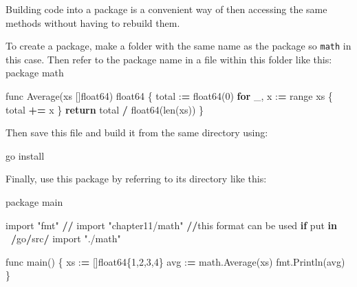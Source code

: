 \documentclass[]{book}
\newenvironment{Shaded}{\begin{snugshade}}{\end{snugshade}}
\newcommand{\BuiltInTok}[1]{#1}
\newcommand{\ControlFlowTok}[1]{\textcolor[rgb]{0.13,0.29,0.53}{\textbf{#1}}}
\newcommand{\DecValTok}[1]{\textcolor[rgb]{0.00,0.00,0.81}{#1}}
\newcommand{\ImportTok}[1]{#1}
\newcommand{\KeywordTok}[1]{\textcolor[rgb]{0.13,0.29,0.53}{\textbf{#1}}}
\newcommand{\NormalTok}[1]{#1}
\newcommand{\OperatorTok}[1]{\textcolor[rgb]{0.81,0.36,0.00}{\textbf{#1}}}
\newcommand{\StringTok}[1]{\textcolor[rgb]{0.31,0.60,0.02}{#1}}
\begin{document}
Building code into a package is a convenient way of then accessing the same methods without having to rebuild them.

To create a package, make a folder with the same name as the package so \texttt{math} in this case. Then refer to the package name in a file within this folder like this:
package math

\begin{Shaded}
\begin{Highlighting}[]
\NormalTok{func Average(xs []float64) float64 \{}
\NormalTok{    total :}\OperatorTok{=}\NormalTok{ float64(}\DecValTok{0}\NormalTok{)             }
    \ControlFlowTok{for}\NormalTok{ _, x :}\OperatorTok{=} \BuiltInTok{range}\NormalTok{ xs \{          }
\NormalTok{        total }\OperatorTok{+=}\NormalTok{ x                  }
\NormalTok{    \}                               }
    \ControlFlowTok{return}\NormalTok{ total }\OperatorTok{/}\NormalTok{ float64(}\BuiltInTok{len}\NormalTok{(xs)) }
\NormalTok{\}                                   }
\end{Highlighting}
\end{Shaded}

Then save this file and build it from the same directory using:

\begin{Shaded}
\begin{Highlighting}[]
\NormalTok{go install}
\end{Highlighting}
\end{Shaded}

Finally, use this package by referring to its directory like this:

\begin{Shaded}
\begin{Highlighting}[]
\NormalTok{package main                          }
                                      
\ImportTok{import} \StringTok{"fmt"}                          
\OperatorTok{//} \ImportTok{import} \StringTok{"chapter11/math"} \OperatorTok{//}\NormalTok{this }\BuiltInTok{format}\NormalTok{ can be used }\ControlFlowTok{if}\NormalTok{ put }\KeywordTok{in} \OperatorTok{~/}\NormalTok{go}\OperatorTok{/}\NormalTok{src}\OperatorTok{/}
\ImportTok{import} \StringTok{"./math"}                       
                                      
\NormalTok{func main() \{                         }
\NormalTok{    xs :}\OperatorTok{=}\NormalTok{ []float64\{}\DecValTok{1}\NormalTok{,}\DecValTok{2}\NormalTok{,}\DecValTok{3}\NormalTok{,}\DecValTok{4}\NormalTok{\}          }
\NormalTok{    avg :}\OperatorTok{=}\NormalTok{ math.Average(xs)           }
\NormalTok{    fmt.Println(avg)                  }
\NormalTok{\}                                     }
\end{Highlighting}
\end{Shaded}
\end{document}
